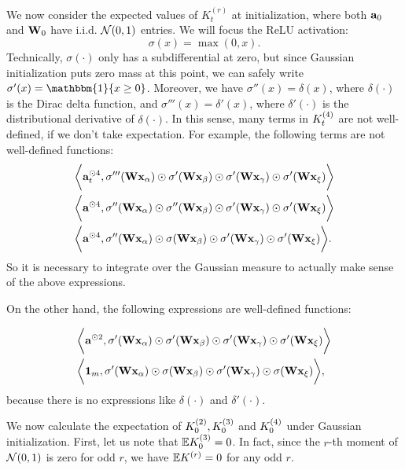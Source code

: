 We now consider the expected values of $K^{(r)}_t$ at initialization, where both ${\mathbf{a}}_0$ and ${\mathbf{W}}_0$ have i.i.d. ${\mathcal{N}}(0, 1)$ entries. We will focus the ReLU activation:
\begin{equation}
	\sigma(x ) = \max(0, x).
\end{equation}
Technically, $\sigma(\cdot)$ only has a subdifferential at zero, but since Gaussian initialization puts zero mass at this point, we can safely write $\sigma'(x ) = \mathbbm{1}\{x\geq 0\}$. Moreover, we have $\sigma''(x ) = \delta(x )$, where $\delta(\cdot)$ is the Dirac delta function, and $\sigma'''(x )= \delta'(x )$, where $\delta'(\cdot)$ is the distributional derivative of $\delta(\cdot)$. In this sense, many terms in ${K}^{(4)}_t$ are not well-defined, if we don't take expectation. For example, the following terms are not well-defined functions:
\begin{align*}
	& \bigg\langle{\mathbf{a}}_t^{\odot 4}, \sigma'''({\mathbf{W}}{\mathbf{x}}_\alpha) \odot \sigma'({\mathbf{W}} {\mathbf{x}}_\beta) \odot \sigma'({\mathbf{W}} {\mathbf{x}}_\gamma) \odot \sigma'({\mathbf{W}} {\mathbf{x}}_\xi) \bigg\rangle \\
	& \bigg\langle{\mathbf{a}}^{\odot 4}, \sigma''({\mathbf{W}} {\mathbf{x}}_\alpha) \odot \sigma''({\mathbf{W}} {\mathbf{x}}_\beta) \odot \sigma'({\mathbf{W}} {\mathbf{x}}_\gamma) \odot \sigma'({\mathbf{W}} {\mathbf{x}}_\xi)\bigg\rangle \\
	&  \bigg\langle{\mathbf{a}}^{\odot 4}, \sigma''({\mathbf{W}} {\mathbf{x}}_\alpha) \odot \sigma({\mathbf{W}} {\mathbf{x}}_\beta) \odot \sigma'({\mathbf{W}} {\mathbf{x}}_\gamma) \odot \sigma'({\mathbf{W}} {\mathbf{x}}_\xi)\bigg\rangle.
\end{align*}
So it is necessary to integrate over the Gaussian measure to actually make sense of the above expressions.

On the other hand, the following expressions are well-defined functions:

\begin{align*}
		& \bigg\langle{\mathbf{a}}^{\odot 2},\sigma'({\mathbf{W}} {\mathbf{x}}_\alpha) \odot \sigma'({\mathbf{W}} {\mathbf{x}}_\beta) \odot \sigma'({\mathbf{W}} {\mathbf{x}}_\gamma) \odot \sigma'({\mathbf{W}} {\mathbf{x}}_\xi)   \bigg\rangle \\
		& \bigg\langle \mathbf{1}_m, \sigma'({\mathbf{W}} {\mathbf{x}}_\alpha) \odot \sigma({\mathbf{W}} {\mathbf{x}}_\beta) \odot \sigma'({\mathbf{W}} {\mathbf{x}}_\gamma) \odot \sigma({\mathbf{W}} {\mathbf{x}}_\xi)  \bigg\rangle, 
\end{align*}
because there is no expressions like $\delta(\cdot)$ and $\delta'(\cdot)$.

We now calculate the expectation of ${K}^{(2)}_0, {K}^{(3)}_0$ and ${K}^{(4)}_0$ under Gaussian initialization. First, let us note that ${\mathbb{E}} {K}^{(3)}_0 = 0$. In fact, since the $r$-th moment of ${\mathcal{N}}(0, 1)$ is zero for odd $r$, we have ${\mathbb{E}} K^{(r)} = 0$ for any odd $r$.

